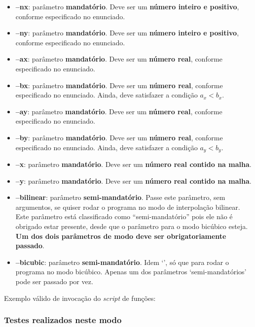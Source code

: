 \documentclass[11pt]{article}
\begin{document}
\begin{itemize}
  \item \textbf{--nx}: parâmetro \textbf{mandatório}. Deve ser um \textbf{número inteiro e positivo}, conforme especificado no enunciado.
  \item \textbf{--ny}: parâmetro \textbf{mandatório}. Deve ser um \textbf{número inteiro e positivo}, conforme especificado no enunciado.
  \item \textbf{--ax}: parâmetro \textbf{mandatório}. Deve ser um \textbf{número real}, conforme especificado no enunciado.
  \item \textbf{--bx}: parâmetro \textbf{mandatório}. Deve ser um \textbf{número real}, conforme especificado no enunciado. Ainda, deve satisfazer a condição $a_x < b_x$.
  \item \textbf{--ay}: parâmetro \textbf{mandatório}. Deve ser um \textbf{número real}, conforme especificado no enunciado.
  \item \textbf{--by}: parâmetro \textbf{mandatório}. Deve ser um \textbf{número real}, conforme especificado no enunciado. Ainda, deve satisfazer a condição $a_y < b_y$.
  \item \textbf{--x}: parâmetro \textbf{mandatório}. Deve ser um \textbf{número real contido na malha}.
  \item \textbf{--y}: parâmetro \textbf{mandatório}. Deve ser um \textbf{número real contido na malha}.
  \item \textbf{--bilinear}: parâmetro \textbf{semi-mandatório}. Passe este parâmetro, sem argumentos, se quiser rodar o programa no modo de interpolação bilinear. Este
  parâmetro está classificado como ``semi-mandatório'' pois ele não é obrigado estar presente, desde que o parâmetro para o modo bicúbico esteja. \textbf{Um dos dois parâmetros de modo
  deve ser obrigatoriamente passado}.
  \item \textbf{--bicubic}: parâmetro \textbf{semi-mandatório}. Idem `{}', só que para rodar o programa no modo bicúbico. Apenas um dos parâmetros `semi-mandatórios' pode ser passado por vez.
\end{itemize}

Exemplo válido de invocação do \textit{script} de funções:
\begin{flushleft}
  {}
\end{flushleft}

\subsubsection{Testes realizados neste modo}
\end{document}
